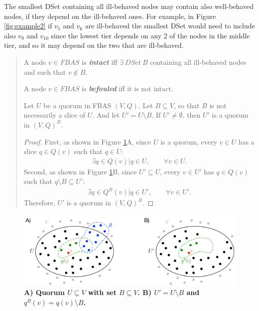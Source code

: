 The smallest DSet containing all ill-behaved nodes may contain also well-behaved nodes, if they depend on the ill-behaved ones. For example, in Figure \ref{fig:example2} if $v_5$ and $v_6$ are ill-behaved the smallest DSet would need to include also $v_9$ and $v_{10}$ since the lowest tier depends on any 2 of the nodes in the middle tier, and so it may depend on the two that are ill-behaved.
\begin{quote}
\vspace{-0.6cm}
\small
\begin{defin}
\label{intact}
A node $v \in FBAS$ is \emph{\textbf{intact}} iff $\exists\  DSet\  B$ containing all ill-behaved nodes and such that $v \notin B$.
\end{defin}
\begin{defin}
\label{befouled}
A node $v \in FBAS$ is \emph{\textbf{befouled}} iff it is not intact.
\end{defin}
\begin{theorem}
\label{theorem1}
Let $U$ be a quorum in FBAS $(V, Q)$. Let $B \subseteq V$, so that $B$ is not necessarily a slice of $U$. And let $U' = U \setminus B$. If $U' \neq \emptyset$, then $U'$ is a quorum in $(V, Q)^B$.
\end{theorem}
\begin{proof}
First, as shown in Figure \ref{fig:theorem1}A, since $U$ is a quorum, every $v \in U$ has a slice $q \in Q(v)$ such that $q \in U$:
\begin{align}
\exists q \in Q(v) | q\in U, \qquad \forall v \in U.
\end{align}
Second, as shown in Figure \ref{fig:theorem1}B, since $U' \subseteq U$, every $v \in U'$ has $q \in Q(v)$ such that $q \setminus B \subseteq U'$:
\begin{align}
\exists q \in Q^B(v) | q \in U', \qquad \forall v \in U'.
\end{align}
Therefore, $U'$ is a quorum in $(V, Q)^B$.
\end{proof}
\end{quote}

\begin{figure}[H]
\centering
\includegraphics[width=15 cm]{Figures/theorem1}
\caption{\bf \small A) Quorum $U \subseteq V$ with set $B \subseteq V$. B) $U' = U \setminus B$ and $q^B(v) = q(v) \setminus B$.}
\label{fig:theorem1}
\end{figure}

